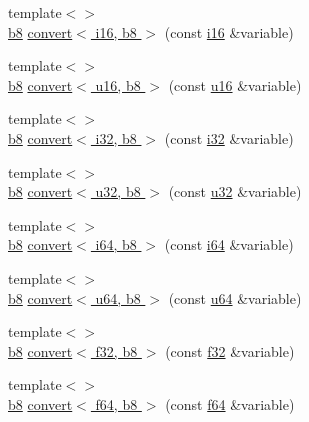\begin{DoxyCompactItemize}
\item 
{\footnotesize template$<$$>$ }\\\hyperlink{types_8h_a74eb47b4ab9e428eab7b91b3b877fa6c}{b8} \hyperlink{namespacecrap_a23f635fce8723983beb2cc3ff103d81c}{convert$<$ i16, b8 $>$} (const \hyperlink{types_8h_ad309dbcaeea13aa602d686964156ea0b}{i16} \&variable)
\item 
{\footnotesize template$<$$>$ }\\\hyperlink{types_8h_a74eb47b4ab9e428eab7b91b3b877fa6c}{b8} \hyperlink{namespacecrap_aabdfb1926060025ab5027bd9ef2e1b44}{convert$<$ u16, b8 $>$} (const \hyperlink{types_8h_ace9d960e74685e2cd84b36132dbbf8aa}{u16} \&variable)
\item 
{\footnotesize template$<$$>$ }\\\hyperlink{types_8h_a74eb47b4ab9e428eab7b91b3b877fa6c}{b8} \hyperlink{namespacecrap_a7042f72d1f746386852946dd6f3b91c8}{convert$<$ i32, b8 $>$} (const \hyperlink{types_8h_a48d6cd8e4135fb2ff7e7f2dac84089ec}{i32} \&variable)
\item 
{\footnotesize template$<$$>$ }\\\hyperlink{types_8h_a74eb47b4ab9e428eab7b91b3b877fa6c}{b8} \hyperlink{namespacecrap_aa4d6f3795608cdae81fe9ea8a0d39ec8}{convert$<$ u32, b8 $>$} (const \hyperlink{types_8h_afaa62991928fb9fb18ff0db62a040aba}{u32} \&variable)
\item 
{\footnotesize template$<$$>$ }\\\hyperlink{types_8h_a74eb47b4ab9e428eab7b91b3b877fa6c}{b8} \hyperlink{namespacecrap_ae5aa682fb088a57a2a921f3063d16108}{convert$<$ i64, b8 $>$} (const \hyperlink{types_8h_a85cb35fbe5bf2961d7ad5f26814a91a2}{i64} \&variable)
\item 
{\footnotesize template$<$$>$ }\\\hyperlink{types_8h_a74eb47b4ab9e428eab7b91b3b877fa6c}{b8} \hyperlink{namespacecrap_a5436cfba252ba948ecff818c447c4537}{convert$<$ u64, b8 $>$} (const \hyperlink{types_8h_a3f7e2bcbb0b4c338f3c4f6c937cd4234}{u64} \&variable)
\item 
{\footnotesize template$<$$>$ }\\\hyperlink{types_8h_a74eb47b4ab9e428eab7b91b3b877fa6c}{b8} \hyperlink{namespacecrap_a5316dd884f794ace5811dce26e4ba682}{convert$<$ f32, b8 $>$} (const \hyperlink{types_8h_a154db6eda6a99565cb060a1da4b4c930}{f32} \&variable)
\item 
{\footnotesize template$<$$>$ }\\\hyperlink{types_8h_a74eb47b4ab9e428eab7b91b3b877fa6c}{b8} \hyperlink{namespacecrap_acba494aa4ce4985f2816541c24d78ed9}{convert$<$ f64, b8 $>$} (const \hyperlink{types_8h_a76c9f53497f766e57b184bc8a93ab73f}{f64} \&variable)

\end{DoxyCompactItemize}
